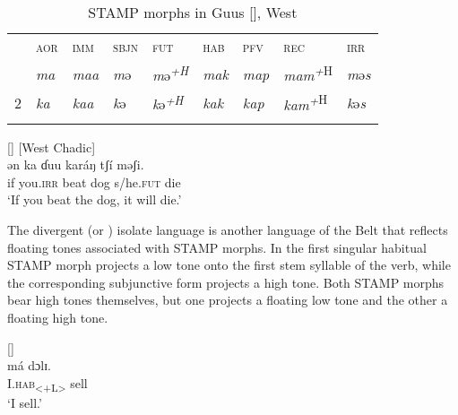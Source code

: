 \documentclass[output=paper]{langsci/langscibook}
\begin{document}
\begin{table}
\caption{STAMP morphs in Guus [], West  \citep[8-9]{Caron2001}}
\label{tab:Anderson:3}

\begin{tabularx}{\textwidth}{XXXXXXXXX} & \scshape aor & \scshape imm & \scshape sbjn & \scshape fut & \scshape hab & \scshape pfv & \scshape rec & \scshape irr\\
\lsptoprule
1 & \itshape ma & \itshape maa & \textit{m}ə & \textit{m}ə\textit{\textsuperscript{+H}} & \itshape mak & \itshape map & \textit{mam}\textit{\textsuperscript{+}}\textsuperscript{H} & \textit{m}ə\textit{s}\\
2 & \itshape ka & \itshape kaa & \textit{k}ə & \textit{k}ə\textit{\textsuperscript{+H}} & \itshape kak & \itshape kap & \textit{kam}\textit{\textsuperscript{+}}\textsuperscript{H} & \textit{k}ə\textit{s}\\
\lspbottomrule
\end{tabularx}
\end{table}

\ea\label{ex:anderson:13}
 []  \citep[11]{Caron2001}          [West Chadic]\\
\gll ən  ka    ɗuu  karáŋ    tʃí    məʃi.\\
if  you\textsc{.irr}  beat  dog    s/he\textsc{.fut}  die\\
\glt `If you beat the dog, it will die.'   
\z

The divergent  (or ) isolate language  is another language of the  Belt that reflects floating tones associated with STAMP morphs. In   the first singular habitual STAMP morph projects a low tone onto the first stem syllable of the verb, while the corresponding subjunctive form projects a high tone. Both STAMP morphs bear high tones themselves, but one projects a floating low tone and the other a floating high tone.

\ea\label{ex:anderson:14}
 \citep[193]{Elders2007}          []\\
\ea\label{ex:anderson:14a}
\gll má     dɔlɪ.  \\
  \textsc{I.hab}\textsubscript{<+L>}  sell\\        
\glt `I sell.'            
\end{document}
